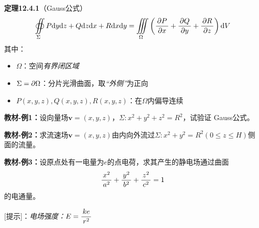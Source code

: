 {\bf 定理12.4.1}（Gauss公式）
$$\oiint\limits_{\Sigma}P\mathrm{d} y\mathrm{d} z+Q\mathrm{d} z\mathrm{d} x+R\mathrm{d} x\mathrm{d} y=\iiint\limits_{\Omega}
\left(\displaystyle\frac{\,{\partial P}\,}{\,{\partial x}\,}+\displaystyle\frac{\,{\partial Q}\,}{\,{\partial y}\,}+\displaystyle\frac{\,{\partial R}\,}{\,{\partial z}\,}\right)\mathrm{d} V$$
其中：
\begin{itemize}
  \setlength{\itemindent}{1cm}
  \item {$\Omega$：}空间{\it 有界闭区域}
  \item {$\Sigma=\partial\Omega$：}分片光滑曲面，取{\it “外侧”}为正向
  \item {$P(x,y,z),Q(x,y,z),R(x,y,z)$：}在$\Omega$内偏导连续
\end{itemize}

{\bf 教材-例1：}设向量场$\bm{v}=(x,y,z)$，$\Sigma:x^2+y^2+z^2=R^2$，试验证
Gauss公式。

{\bf 教材-例2：}求流速场$\bm{v}=(x,y,z)$由内向外流过$\Sigma:x^2+y^2=R^2
(0\leq z\leq H)$侧面的流量。

{\bf 教材-例3：}设原点处有一电量为$e$的点电荷，求其产生的静电场通过曲面
$$\displaystyle\frac{\,{x^2}\,}{\,{a^2}\,}+\displaystyle\frac{\,{y^2}\,}{\,{b^2}\,}+\displaystyle\frac{\,{z^2}\,}{\,{c^2}\,}=1$$
的电通量。

[提示]：{\it 电场强度：}${E=\displaystyle\frac{\,{ke}\,}{\,{r^2}\,}}$

